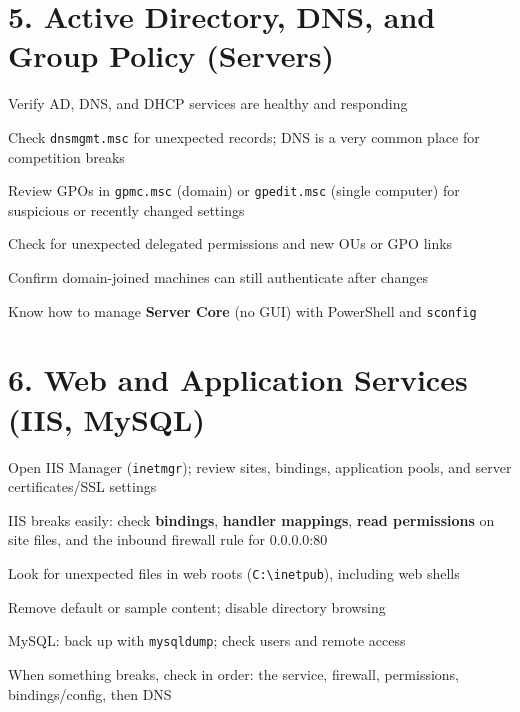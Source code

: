 \documentclass[11pt]{article}
\newcommand{\cmd}[1]{\texttt{\small #1}}
\begin{document}
\section*{5. Active Directory, DNS, and Group Policy (Servers)}
\begin{mycheck}
  \item Verify AD, DNS, and DHCP services are healthy and responding
  \item Check \cmd{dnsmgmt.msc} for unexpected records; DNS is a very common place for competition breaks
  \item Review GPOs in \cmd{gpmc.msc} (domain) or \cmd{gpedit.msc} (single computer) for suspicious or recently changed settings
  \item Check for unexpected delegated permissions and new OUs or GPO links
  \item Confirm domain-joined machines can still authenticate after changes
  \item Know how to manage \textbf{Server Core} (no GUI) with PowerShell and \cmd{sconfig}
\end{mycheck}

\section*{6. Web and Application Services (IIS, MySQL)}
\begin{mycheck}
  \item Open IIS Manager (\cmd{inetmgr}); review sites, bindings, application pools, and server certificates/SSL settings
  \item IIS breaks easily: check \textbf{bindings}, \textbf{handler mappings}, \textbf{read permissions} on site files, and the inbound firewall rule for 0.0.0.0:80
  \item Look for unexpected files in web roots (\cmd{C:\textbackslash inetpub}), including web shells
  \item Remove default or sample content; disable directory browsing
  \item MySQL: back up with \cmd{mysqldump}; check users and remote access
  \item When something breaks, check in order: the service, firewall, permissions, bindings/config, then DNS
\end{mycheck}
\end{document}

